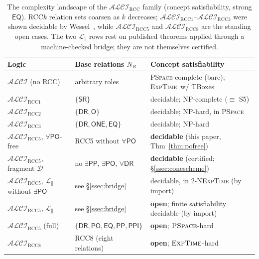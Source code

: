\documentclass[11pt]{article}
\newcommand{\ALCIRCC}[1]{\mathcal{ALCI}_{\mathrm{RCC#1}}}
\newcommand{\DR}{\mathsf{DR}}
\newcommand{\PO}{\mathsf{PO}}
\newcommand{\PP}{\mathsf{PP}}
\newcommand{\PPI}{\mathsf{PPI}}
\newcommand{\EQ}{\mathsf{EQ}}
\newcommand{\EXPTIME}{\textsc{ExpTime}}
\newcommand{\PSPACE}{\textsc{PSpace}}
\newcommand{\ALCI}{\ensuremath{\mathcal{ALCI}}}
\theoremstyle{plain}
\theoremstyle{definition}
\begin{document}
\begin{table}[t]
\centering
\small
\setlength{\tabcolsep}{5pt}
\renewcommand{\arraystretch}{1.25}
\begin{tabular}{@{}lll@{}}
\toprule
Logic & Base relations $N_R$ & Concept satisfiability \\
\midrule
$\ALCI$ (no RCC)             & arbitrary roles                & \PSPACE-complete (bare); \EXPTIME\ w/ TBoxes \\
$\ALCIRCC1$                  & $\{\mathsf{SR}\}$              & decidable; \textsc{NP}-complete ($\equiv$ S5) \\
$\ALCIRCC2$                  & $\{\DR,\mathsf{O}\}$          & decidable; \textsc{NP}-hard, in \PSPACE \\
$\ALCIRCC3$                  & $\{\DR,\mathsf{ONE},\EQ\}$    & decidable; \textsc{NP}-hard \\
$\ALCIRCC5$, $\forall\PO$-free & RCC5 without $\forall\PO$   & \textbf{decidable} (this paper, Thm~\ref{thm:pofree}) \\
$\ALCIRCC5$, fragment $\mathcal D$ & no $\exists\PP$, $\exists\PO$, $\forall\DR$ & \textbf{decidable} (certified; \S\ref{ssec:conescheme}) \\
$\ALCIRCC5$, $\mathcal L_{\parallel}$ without $\exists\PO$ & see \S\ref{ssec:bridge} & decidable, in 2-\textsc{NExpTime} (by import) \\
$\ALCIRCC5$, $\mathcal L_{\parallel}$ & see \S\ref{ssec:bridge} & \textbf{open}; finite satisfiability decidable (by import) \\
$\ALCIRCC5$ (full)          & $\{\DR,\PO,\EQ,\PP,\PPI\}$    & \textbf{open}; $\PSPACE$-hard \\
$\ALCIRCC8$                 & RCC8 (eight relations)         & \textbf{open}; $\EXPTIME$-hard \\
\bottomrule
\end{tabular}
\caption{The complexity landscape of the $\ALCIRCC{}$ family (concept
satisfiability, strong $\EQ$). RCC$k$ relation sets coarsen as $k$
decreases; $\ALCIRCC1$--$\ALCIRCC3$ were shown decidable by
Wessel~\cite{Wessel2003}, while $\ALCIRCC5$ and $\ALCIRCC8$ are the
standing open cases. The two $\mathcal L_{\parallel}$ rows rest on published
theorems applied through a machine-checked bridge; they are not themselves
certified.}
\label{tab:complexity}
\end{table}
\end{document}
